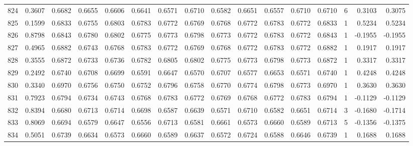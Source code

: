 \begin{tabular}{lrrrrrrrrrrrrrrr}
824 &      0.3607 &  0.6682 &  0.6655 &  0.6606 &  0.6641 &  0.6571 &  0.6710 &  0.6582 &  0.6651 &  0.6557 &   0.6710 &     0.6710 &      6 &                    0.3103 &                     0.3075 \\
825 &      0.1599 &  0.6833 &  0.6755 &  0.6803 &  0.6783 &  0.6772 &  0.6769 &  0.6768 &  0.6772 &  0.6783 &   0.6772 &     0.6833 &      1 &                    0.5234 &                     0.5234 \\
826 &      0.8798 &  0.6843 &  0.6780 &  0.6802 &  0.6775 &  0.6773 &  0.6798 &  0.6773 &  0.6772 &  0.6783 &   0.6772 &     0.6843 &      1 &                   -0.1955 &                    -0.1955 \\
827 &      0.4965 &  0.6882 &  0.6743 &  0.6768 &  0.6783 &  0.6772 &  0.6769 &  0.6768 &  0.6772 &  0.6783 &   0.6772 &     0.6882 &      1 &                    0.1917 &                     0.1917 \\
828 &      0.3555 &  0.6872 &  0.6733 &  0.6736 &  0.6782 &  0.6805 &  0.6802 &  0.6775 &  0.6773 &  0.6798 &   0.6773 &     0.6872 &      1 &                    0.3317 &                     0.3317 \\
829 &      0.2492 &  0.6740 &  0.6708 &  0.6699 &  0.6591 &  0.6647 &  0.6570 &  0.6707 &  0.6577 &  0.6653 &   0.6571 &     0.6740 &      1 &                    0.4248 &                     0.4248 \\
830 &      0.3340 &  0.6970 &  0.6756 &  0.6750 &  0.6752 &  0.6796 &  0.6758 &  0.6770 &  0.6774 &  0.6798 &   0.6773 &     0.6970 &      1 &                    0.3630 &                     0.3630 \\
831 &      0.7923 &  0.6794 &  0.6734 &  0.6743 &  0.6768 &  0.6783 &  0.6772 &  0.6769 &  0.6768 &  0.6772 &   0.6783 &     0.6794 &      1 &                   -0.1129 &                    -0.1129 \\
832 &      0.8394 &  0.6680 &  0.6713 &  0.6714 &  0.6698 &  0.6587 &  0.6639 &  0.6571 &  0.6710 &  0.6582 &   0.6651 &     0.6714 &      3 &                   -0.1680 &                    -0.1714 \\
833 &      0.8069 &  0.6694 &  0.6579 &  0.6647 &  0.6556 &  0.6713 &  0.6581 &  0.6661 &  0.6573 &  0.6660 &   0.6589 &     0.6713 &      5 &                   -0.1356 &                    -0.1375 \\
834 &      0.5051 &  0.6739 &  0.6634 &  0.6573 &  0.6660 &  0.6589 &  0.6637 &  0.6572 &  0.6724 &  0.6588 &   0.6646 &     0.6739 &      1 &                    0.1688 &                     0.1688 \\

\end{tabular}

